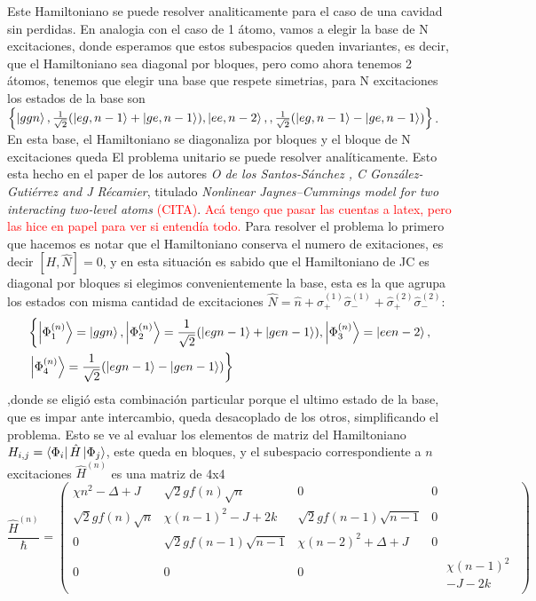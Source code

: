 Este Hamiltoniano se puede resolver analiticamente para el caso de una cavidad sin perdidas. En analogia con el caso de 1 átomo, vamos a elegir la base de N excitaciones, donde esperamos que estos subespacios queden invariantes, es decir, que el Hamiltoniano sea diagonal por bloques, pero como ahora tenemos 2 átomos, tenemos que elegir una base que respete simetrias, para N excitaciones los estados de la base son $\left\{\ket{ggn},\frac{1}{\sqrt{2}}(\ket{eg,n-1}+\ket{ge,n-1}),\ket{ee,n-2},,\frac{1}{\sqrt{2}}(\ket{eg,n-1}-\ket{ge,n-1})\right\}$. En esta base, el Hamiltoniano se diagonaliza por bloques y el bloque de N excitaciones queda
El problema unitario se puede resolver analíticamente. Esto esta hecho en el paper de los autores \textit{O de los Santos-Sánchez
, C González-Gutiérrez and J Récamier}, titulado \textit{Nonlinear Jaynes–Cummings model for two
interacting two-level atoms} \cite{paper:santos}\textcolor{red}{(CITA)}. 
\textcolor{red}{Ac\'a tengo que pasar las cuentas a latex, pero las hice en papel para ver si entend\'ia todo.}
Para resolver el problema lo primero que hacemos es notar que el Hamiltoniano conserva el numero de exitaciones, es decir $[H,\hat N]=0$, y en esta situación es sabido que el Hamiltoniano de JC es diagonal por bloques si elegimos convenientemente la base, esta es la que agrupa los estados con misma cantidad de excitaciones $\hat N = \hat n + \hat \sigma_+^{(1)}\hat \sigma_-^{(1)}+\hat \sigma_+^{(2)}\hat \sigma_-^{(2)}$: 
\begin{equation}
\begin{split}
    & \left\{\ket{\Phi^{(n)}_1}=\ket{ggn},\ket{\Phi^{(n)}_2}=\frac{1}{\sqrt{2}}(\ket{egn-1}+\ket{gen-1}),\ket{\Phi^{(n)}_3}=\ket{een-2},\right. \\
& \left. \ket{\Phi^{(n)}_4}=\frac{1}{\sqrt{2}}(\ket{egn-1}-\ket{gen-1})\right\} 
\end{split}
\label{ec4:base}
\end{equation}
,donde se eligi\'o esta combinaci\'on particular porque el ultimo estado de la base, que es impar ante intercambio, queda desacoplado de los otros, simplificando el problema. Esto se ve al evaluar los elementos de matriz del Hamiltoniano $H_{i,j}=\bra{\Phi_i}\hat H \ket{\Phi_j}$, este queda en bloques, y el subespacio correspondiente a $n$ excitaciones $\hat H^{(n)}$ es una matriz de 4x4
\begin{equation}
    \frac{\hat H^{(n)}}{\hbar}=
    \begin{pmatrix}
     \chi n^2 - \Delta +  J & \sqrt{2} g f(n)\sqrt{n} & 0 & 0 \\
    \sqrt{2} g f(n)\sqrt{n} &  \chi (n-1)^2  -  J + 2 k & \sqrt{2} g f(n-1)\sqrt{n-1} & 0 \\
    0 & \sqrt{2} g f(n-1)\sqrt{n-1} &  \chi (n-2)^2 +  \Delta +  J & 0 \\
    0&0&0& \begin{aligned} 
                 & \chi (n-1)^2  \\ 
                 &-  J - 2 k
        \end{aligned}
    \end{pmatrix}
\end{equation}

